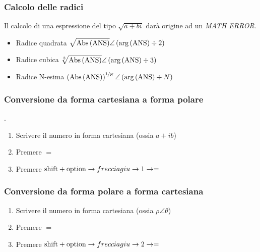 \documentclass{article}
\begin{document}
\subsubsection{Calcolo delle radici}
 Il calcolo di una espressione del tipo \(\sqrt{a+bi}\) darà origine ad un \textit{MATH ERROR}.
\begin{itemize}
	\item Radice quadrata \( \displaystyle \sqrt{ \textnormal{Abs} \left( \textnormal{ANS} \right) } \angle \left( \textnormal{arg} \left( \textnormal{ANS} \right) \div 2 \right) \)
	\item Radice cubica \( \displaystyle \sqrt[3]{ \textnormal{Abs} \left( \textnormal{ANS} \right) } \angle \left( \textnormal{arg} \left( \textnormal{ANS} \right) \div 3 \right) \)
	\item Radice N-esima \(  \left( \textnormal{Abs} \left( \textnormal{ANS} \right) \right) ^ {\sfrac{1}{N}} \angle \left(\textnormal{arg} \left( \textnormal{ANS} \right) \div N \right)\)
\end{itemize}

\subsubsection{Conversione da forma cartesiana a forma polare}.
\begin{enumerate}
	\item Scrivere il numero in forma cartesiana (ossia \(a + ib\))
	\item Premere \(=\)
	\item Premere \(\textnormal{shift} + \textnormal{option} \rightarrow freccia giu \rightarrow 1 \rightarrow = \)
\end{enumerate}

\subsubsection{Conversione da forma polare a forma cartesiana}
\begin{enumerate}
	\item Scrivere il numero in forma cartesiana (ossia \(\rho \angle \theta\))
	\item Premere \(=\)
	\item Premere \(\textnormal{shift} + \textnormal{option} \rightarrow freccia giu \rightarrow 2 \rightarrow = \)
\end{enumerate}

\newpage 
\end{document}

